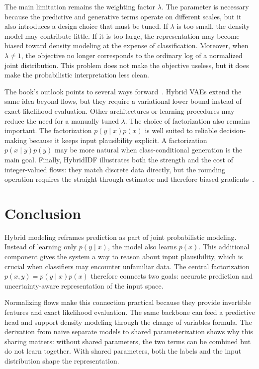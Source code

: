 \documentclass[runningheads]{llncs}
\begin{document}
The main limitation remains the weighting factor \(\lambda\). The parameter is
necessary because the predictive and generative terms operate on different
scales, but it also introduces a design choice that must be tuned. If
\(\lambda\) is too small, the density model may contribute little. If it is too
large, the representation may become biased toward density modeling at the
expense of classification. Moreover, when \(\lambda\neq 1\), the objective no
longer corresponds to the ordinary log of a normalized joint distribution. This
problem does not make the objective useless, but it does make the probabilistic
interpretation less clean.

The book's outlook points to several ways forward~\cite{tomczak2024deep}. Hybrid
VAEs extend the same idea beyond flows, but they require a variational lower
bound instead of exact likelihood evaluation. Other architectures or learning
procedures may reduce the need for a manually tuned \(\lambda\). The choice of
factorization also remains important. The factorization \(p(y\mid x)p(x)\) is
well suited to reliable decision-making because it keeps input plausibility
explicit. A factorization \(p(x\mid y)p(y)\) may be more natural when
class-conditional generation is the main goal. Finally, HybridIDF illustrates
both the strength and the cost of integer-valued flows: they match discrete data
directly, but the rounding operation requires the straight-through estimator and
therefore biased gradients~\cite{hoogeboom2019integer}.

\section{Conclusion}

Hybrid modeling reframes prediction as part of joint probabilistic modeling.
Instead of learning only \(p(y\mid x)\), the model also learns \(p(x)\). This
additional component gives the system a way to reason about input plausibility,
which is crucial when classifiers may encounter unfamiliar data. The central
factorization \(p(x,y)=p(y\mid x)p(x)\) therefore connects two goals: accurate
prediction and uncertainty-aware representation of the input space.

Normalizing flows make this connection practical because they provide invertible
features and exact likelihood evaluation. The same backbone can feed a
predictive head and support density modeling through the change of variables
formula. The derivation from naive separate models to shared parameterization
shows why this sharing matters: without shared parameters, the two terms can be
combined but do not learn together. With shared parameters, both the labels and
the input distribution shape the representation.
\end{document}
